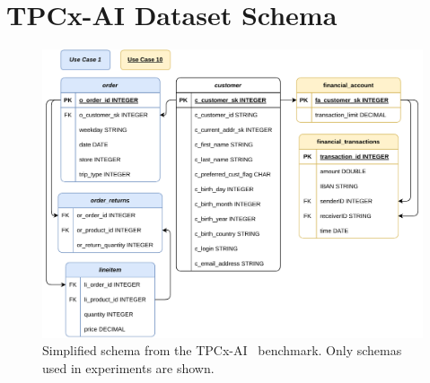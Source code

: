 \chapter{TPCx-AI Dataset Schema}

\begin{figure}[ht]
    \centering
    \includegraphics[width=0.99\linewidth]{appendices/figures/tpc-ai-schema.pdf}
    \caption[Simplified schema from the TPCx-AI~\cite{tpcx-ai} benchmark]{Simplified schema from the TPCx-AI~\cite{tpcx-ai} benchmark. Only schemas used in experiments are shown.}
    \label{fig:appendix-tpc-ai-schema}
\end{figure}